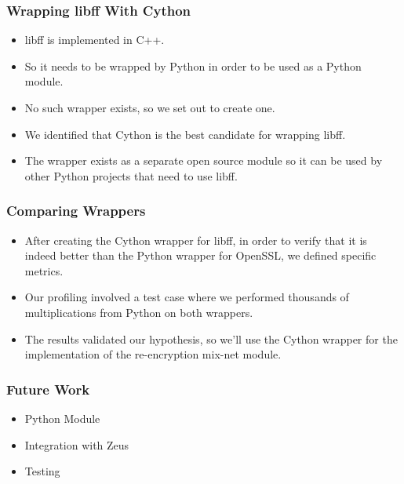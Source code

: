 \documentclass{beamer}
\begin{document}
    \begin{frame}
        \frametitle{Wrapping libff With Cython}
        \begin{itemize}
            \item libff is implemented in C++.
            \item So it needs to be wrapped by Python in order to be used as a
            Python module.
            \item No such wrapper exists, so we set out to create one.
            \item We identified that Cython is the best candidate for wrapping
            libff.
            \item The wrapper exists as a separate open source module
            so it can be used by other Python projects that need to use libff.
        \end{itemize}
    \end{frame}

    \begin{frame}
        \frametitle{Comparing Wrappers}
        \begin{itemize}
            \item After creating the Cython wrapper for libff, in order to
            verify that it is indeed better than the Python wrapper for
            OpenSSL, we defined specific metrics.
            \item Our profiling involved a test case where we performed
            thousands of multiplications from Python on both wrappers.
            \item The results validated our hypothesis, so we'll use the Cython
            wrapper for the implementation of the re-encryption mix-net module.
        \end{itemize}
    \end{frame}

    \begin{frame}
        \frametitle{Future Work}
        \begin{itemize}
            \item Python Module
            \item Integration with Zeus
            \item Testing
        \end{itemize}
    \end{frame}
    \begin{frame}
    \end{frame}
\end{document}
